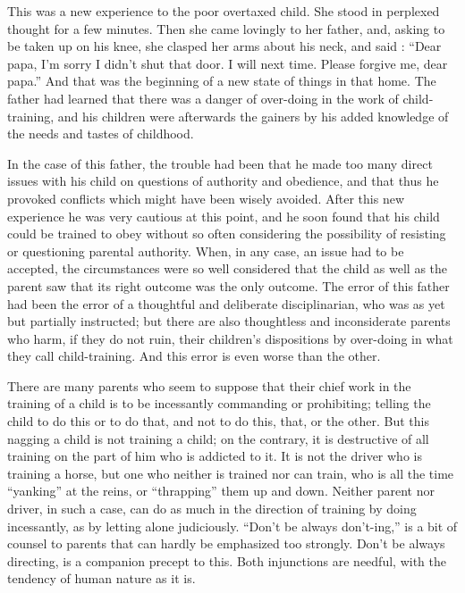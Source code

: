 \documentclass[
]{book}
\begin{document}
This was a new experience to the poor overtaxed child. She stood in perplexed thought for a few minutes. Then she came lovingly to her father, and, asking to be taken up on his knee, she clasped her arms about his neck, and said : ``Dear papa, I'm sorry I didn't shut that door. I will next time. Please forgive me, dear papa.'' And that was the beginning of a new state of things in that home. The father had learned that there was a danger of over-doing in the work of child-training, and his children were afterwards the gainers by his added knowledge of the needs and tastes of childhood.

In the case of this father, the trouble had been that he made too many direct issues with his child on questions of authority and obedience, and that thus he provoked conflicts which might have been wisely avoided. After this new experience he was very cautious at this point, and he soon found that his child could be trained to obey without so often considering the possibility of resisting or questioning parental authority. When, in any case, an issue had to be accepted, the circumstances were so well considered that the child as well as the parent saw that its right outcome was the only outcome. The error of this father had been the error of a thoughtful and deliberate disciplinarian, who was as yet but partially instructed; but there are also thoughtless and inconsiderate parents who harm, if they do not ruin, their children's dispositions by over-doing in what they call child-training. And this error is even worse than the other.

There are many parents who seem to suppose that their chief work in the training of a child is to be incessantly commanding or prohibiting; telling the child to do this or to do that, and not to do this, that, or the other. But this nagging a child is not training a child; on the contrary, it is destructive of all training on the part of him who is addicted to it. It is not the driver who is training a horse, but one who neither is trained nor can train, who is all the time ``yanking'' at the reins, or ``thrapping'' them up and down. Neither parent nor driver, in such a case, can do as much in the direction of training by doing incessantly, as by letting alone judiciously. ``Don't be always don't-ing,'' is a bit of counsel to parents that can hardly be emphasized too strongly. Don't be always directing, is a companion precept to this. Both injunctions are needful, with the tendency of human nature as it is.
\end{document}
